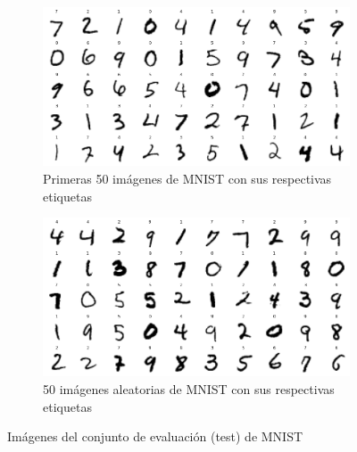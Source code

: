 \begin{figure}[h!]
    \centering
    \begin{subfigure}[b]{0.45\textwidth}
        \centering
        \includegraphics[width=\textwidth]{images/mnist/mnist_test_first50.png}
        \caption{Primeras 50 imágenes de MNIST con sus respectivas etiquetas}
        \label{mnist5}
    \end{subfigure}
    \hspace{1cm}
    \begin{subfigure}[b]{0.45\textwidth}
        \centering
        \includegraphics[width=\textwidth]{images/mnist/mnist_test_random.png}
        \caption{50 imágenes aleatorias de MNIST con sus respectivas etiquetas}
        \label{mnist6}
    \end{subfigure}
    \caption{Imágenes del conjunto de evaluación (test) de MNIST}
    \label{mnist_test}
\end{figure}

